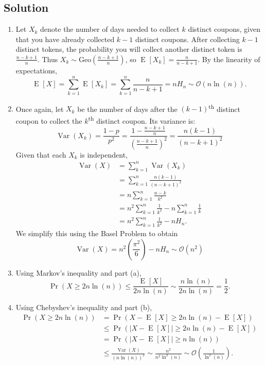 \documentclass[14pt]{extreport}
\newcommand{\Var}[1]{\operatorname{Var}\left(#1\right)}
\newcommand{\E}[2][]{\operatorname{E}_{#1}\left[#2\right]}
\renewcommand{\Pr}[2][]{\operatorname{Pr}_{#1}\left(#2\right)}
\begin{document}
\subsection*{Solution}
    \begin{enumerate}
        \item Let $X_{k}$ denote the number of days needed to collect $k$ distinct coupons, given that you have already collected $k - 1$ distinct coupons. After collecting $k - 1$ distinct tokens, the probability you will collect another distinct token is $\frac{n - k + 1}{n}$. Thus $X_{k} \sim \text{Geo}(\frac{n - k + 1}{n})$, so $\E{X_{k}} = \frac{n}{n - k + 1}$. By the linearity of expectations, $$\E{X} = \sum_{k = 1}^{n} \E{X_{k}} = \sum_{k = 1}^{n} \frac{n}{n - k + 1} = nH_{n} \sim \mathcal{O}(n\ln(n)).$$
        \item Once again, let \(X_k\) be the number of days after the \((k - 1)\)\textsuperscript{th} distinct coupon to collect the \(k\)\textsuperscript{th} distinct coupon. 
        Its variance is:
        \[
        \Var{X_k} = \frac{1 - p}{p^2} = \frac{1 - \frac{n - k + 1}{n}}{\left(\frac{n - k + 1}{n}\right)^2} = \frac{n(k - 1)}{(n - k + 1)^2}
        \]
        Given that each \(X_k\) is independent,
        $$\begin{aligned}
            \Var{X} &= \sum_{k=1}^{n} \Var{X_k} \\
            &= \sum_{k=1}^{n} \frac{n(k - 1)}{(n - k + 1)^2} \\
            &= n \sum_{k=1}^{n} \frac{n - k}{k^2} \\
            &= n^2 \sum_{k=1}^{n} \frac{1}{k^2} - n \sum_{k=1}^{n} \frac{1}{k} \\
            &= n^2 \sum_{k=1}^{n} \frac{1}{k^2} - nH_n.
        \end{aligned}$$
        We simplify this using the Basel Problem to obtain $$\Var{X} = n^2 \left(\frac{\pi^2}{6}\right) - nH_n \sim \mathcal{O}(n^{2})$$
        \item Using Markov's inequality and part (a), $$\Pr{X \geq 2n \ln(n)} \le \frac{\E{X}}{2n \ln(n)} \sim \frac{n\ln(n)}{2n\ln(n)} = \frac{1}{2}.$$
        \item Using Chebyshev's inequality and part (b), 
        $$\begin{aligned}
            \Pr{X \geq 2n \ln(n)} &= \Pr{X - \E{X} \ge 2n \ln(n) - \E{X}} \\
             &\le \Pr{|X - \E{X}| \ge 2n \ln(n) - \E{X}} \\
             &= \Pr{|X - \E{X}| \ge n\ln(n)} \\
             &\le \frac{\Var{X}}{(n\ln(n))^{2}} \sim \frac{n^{2}}{n^{2}\ln^{2}(n)} \sim \mathcal{O}\left(\frac{1}{\ln^{2}(n)}\right).
        \end{aligned}$$
    \end{enumerate}
\end{document}

